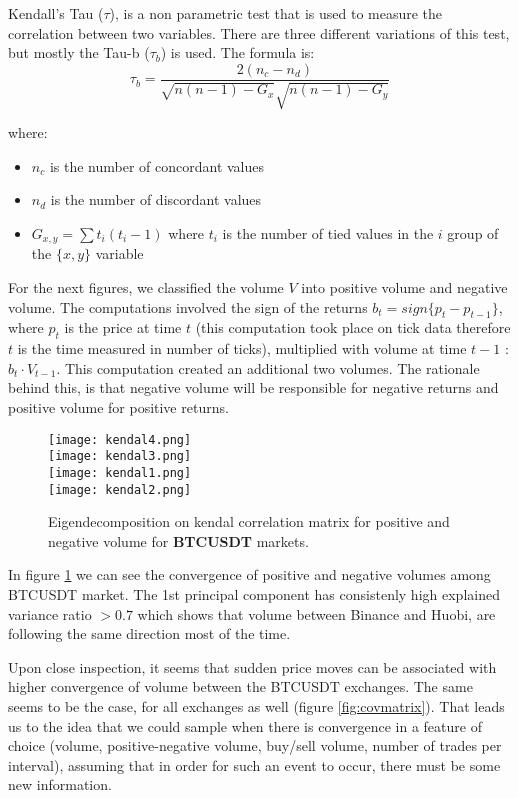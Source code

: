 Kendall's Tau (\(\tau\)), is a non parametric test that is used to measure the correlation between two variables. There are three different variations of this test, but mostly the Tau-b (\(\tau_b\)) is used. The formula is:
\[
\tau_b = \frac{2(n_c - n_d)}{\sqrt{n(n-1) - G_x}\sqrt{n(n-1) - G_y}} 
\]

where:
\begin{itemize}
\item \(n_c\) is the number of concordant values
\item \(n_d\) is the number of discordant values
\item \(G_{x,y} = \sum{t_i(t_i-1)}\) where \(t_i\) is the number of tied values in the \(i\) group of the \(\{x,y\}\) variable
\end{itemize}

For the next figures, we classified the volume \(V\) into positive volume and negative volume. The computations involved the sign of the returns \(b_t = sign\{p_t - p_{t-1}\}\), where \(p_t\) is the price at time \(t\) (this computation took place on tick data therefore \(t\) is the time measured in number of ticks), multiplied with volume at time \(t-1\) : \(b_t \cdot V_{t-1}\). This computation created an additional two volumes. The rationale behind this, is that negative volume will be responsible for negative returns and positive volume for positive returns. 

\begin{figure}[H]
	\centering
    \texttt{[image: kendal4.png]} \\
    \texttt{[image: kendal3.png]} \\ 
    \texttt{[image: kendal1.png]} \\
    \texttt{[image: kendal2.png]} \\
	\caption{Eigendecomposition on kendal correlation matrix for positive and negative volume for \textbf{BTCUSDT} markets.}
    \label{fig:pcakendall}
\end{figure}

In figure \ref{fig:pcakendall} we can see the convergence of positive and negative volumes among BTCUSDT market. The 1st principal component has consistenly high explained variance ratio \( > 0.7 \) which shows that volume between Binance and Huobi, are following the same direction most of the time.

Upon close inspection, it seems that sudden price moves can be associated with higher convergence of volume between the BTCUSDT exchanges. The same seems to be the case, for all exchanges as well (figure \ref{fig:covmatrix}). That leads us to the idea that we could sample when there is convergence in a feature of choice (volume, positive-negative volume, buy/sell volume, number of trades per interval), assuming that in order for such an event to occur, there must be some new information. 

